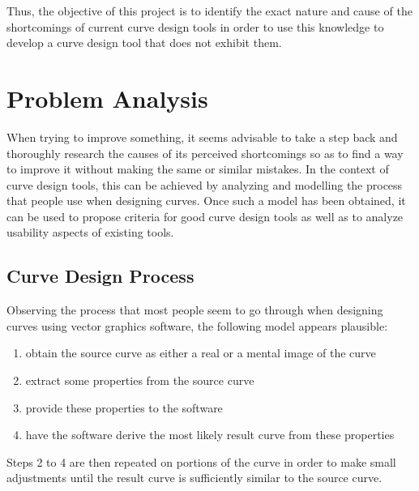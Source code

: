 \documentclass[a4paper]{article}
\begin{document}
		Thus, the objective of this project is to identify the exact nature and cause of the shortcomings of current curve design tools in order to use this knowledge to develop a curve design tool that does not exhibit them.

	\section{Problem Analysis}
	\label{section:problem_analysis}

		When trying to improve something, it seems advisable to take a step back and thoroughly research the causes of its perceived shortcomings so as to find a way to improve it without making the same or similar mistakes. In the context of curve design tools, this can be achieved by analyzing and modelling the process that people use when designing curves. Once such a model has been obtained, it can be used to propose criteria for good curve design tools as well as to analyze usability aspects of existing tools.

		\subsection{Curve Design Process}
		\label{section:curve_design_process}

			Observing the process that most people seem to go through when designing curves using vector graphics software, the following model appears plausible:
			\begin{enumerate}
				\item obtain the source curve as either a real or a mental image of the curve
				\item extract some properties from the source curve
				\item provide these properties to the software
				\item have the software derive the most likely result curve from these properties
			\end{enumerate}

			Steps 2 to 4 are then repeated on portions of the curve in order to make small adjustments until the result curve is sufficiently similar to the source curve.
\end{document}

